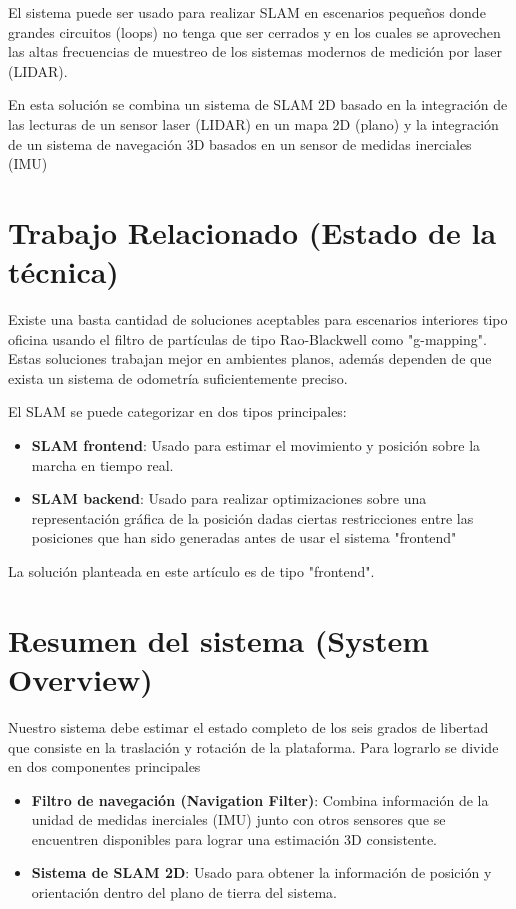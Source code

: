 \documentclass[10pt,a4paper]{article}
\begin{document}
El sistema puede ser usado para realizar SLAM en escenarios pequeños donde grandes circuitos (loops) no tenga que ser cerrados y en los cuales se aprovechen las altas frecuencias de muestreo de los sistemas modernos de medición por laser (LIDAR).

En esta solución se combina un sistema de SLAM 2D basado en la integración de las lecturas de un sensor laser (LIDAR) en un mapa 2D (plano) y la integración de un sistema de navegación 3D basados en un sensor de medidas inerciales (IMU)

\section{Trabajo Relacionado (Estado de la técnica)}

Existe una basta cantidad de soluciones aceptables para escenarios interiores tipo oficina usando el filtro de partículas de tipo Rao-Blackwell como "g-mapping". Estas soluciones trabajan mejor en ambientes planos, además dependen de que exista un sistema de odometría suficientemente preciso.

El SLAM se puede categorizar en dos tipos principales:

\begin{itemize}

\item \textbf{SLAM frontend}: Usado para estimar el movimiento y posición sobre la marcha en tiempo real.
\item \textbf{SLAM backend}: Usado para realizar optimizaciones sobre una representación gráfica de la posición dadas ciertas restricciones entre las posiciones que han sido generadas antes de usar el sistema "frontend"

\end{itemize}

La solución planteada en este artículo es de tipo "frontend".

\section{Resumen del sistema (System Overview)}

Nuestro sistema debe estimar el estado completo de los seis grados de libertad que consiste en la traslación y rotación de la plataforma. Para lograrlo se divide en dos componentes principales

\begin{itemize}

\item \textbf{Filtro de navegación (Navigation Filter)}: Combina información de la unidad de medidas inerciales (IMU) junto con otros sensores que se encuentren disponibles para lograr una estimación 3D consistente.

\item \textbf{Sistema de SLAM 2D}: Usado para obtener la información de posición y orientación dentro del plano de tierra del sistema.

\end{itemize}
\end{document}
